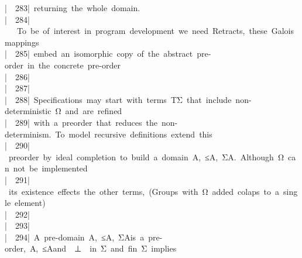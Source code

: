 \documentclass{article}
\newcommand{\syntaxCOMMENTA}[1]{\textcolor[rgb]{0.8,0.0,0.0}{#1}}
\newcommand{\syntaxCOMMENTA}[1]{\textcolor[rgb]{0.8,0.0,0.0}{#1}}
\newcommand{\syntaxCOMMENTA}[1]{\textcolor[rgb]{0.8,0.0,0.0}{#1}}
\newcommand{\syntaxCOMMENTA}[1]{\textcolor[rgb]{0.8,0.0,0.0}{\textbf{#1}}}
\newcommand{\syntaxCOMMENTA}[1]{\textcolor[rgb]{0.8,0.0,0.0}{#1}}
\newcommand{\syntaxCOMMENTA}[1]{\textcolor[rgb]{0.8,0.0,0.0}{#1}}
\newcommand{\syntaxCOMMENTA}[1]{\textcolor[rgb]{0.0,0.0,0.0}{#1}}
\newcommand{\gutter}[1]{\textcolor[rgb]{0,0,0}{{|}#1}}
\newcommand{\gutterH}[1]{\textcolor[rgb]{1,0,0}{{|}#1}}
\begin{document}
\gutter{\ \ 283{|}\ }\syntaxCOMMENTA{returning{\ }the{\ }whole{\ }domain.}\hspace*{\fill}\\
\gutter{\ \ 284{|}\ }\syntaxCOMMENTA{{\ }{\ }To{\ }be{\ }of{\ }interest{\ }in{\ }program{\ }development{\ }we{\ }need{\ }Retracts,{\ }these{\ }Galois{\ }mappings{\ }}\hspace*{\fill}\\
\gutterH{\ \ 285{|}\ }\syntaxCOMMENTA{embed{\ }an{\ }isomorphic{\ }copy{\ }of{\ }the{\ }abstract{\ }pre{-}order{\ }in{\ }the{\ }concrete{\ }pre{-}order}\hspace*{\fill}\\
\gutter{\ \ 286{|}\ }\hspace*{\fill}\\
\gutter{\ \ 287{|}\ }\hspace*{\fill}\\
\gutter{\ \ 288{|}\ }\syntaxCOMMENTA{Specifications{\ }may{\ }start{\ }with{\ }terms{\ }T\usebox{\underscorebox}Σ{\ }that{\ }include{\ }non{-}deterministic{\ }Ω{\ }and{\ }are{\ }refined{\ }}\hspace*{\fill}\\
\gutter{\ \ 289{|}\ }\syntaxCOMMENTA{with{\ }a{\ }preorder{\ }that{\ }reduces{\ }the{\ }non{-}determinism.{\ }To{\ }model{\ }recursive{\ }definitions{\ }extend{\ }this{\ }}\hspace*{\fill}\\
\gutterH{\ \ 290{|}\ }\syntaxCOMMENTA{preorder{\ }by{\ }ideal{\ }completion{\ }to{\ }build{\ }a{\ }domain{\ }\usebox{\lessthan}A,{\ }≤\usebox{\underscorebox}A,{\ }Σ\usebox{\underscorebox}A\usebox{\greaterthan}.{\ }Although{\ }Ω{\ }can{\ }not{\ }be{\ }implemented{\ }}\hspace*{\fill}\\
\gutter{\ \ 291{|}\ }\syntaxCOMMENTA{its{\ }existence{\ }effects{\ }the{\ }other{\ }terms,{\ }(Groups{\ }with{\ }Ω{\ }added{\ }colaps{\ }to{\ }a{\ }single{\ }element)}\hspace*{\fill}\\
\gutter{\ \ 292{|}\ }\hspace*{\fill}\\
\gutter{\ \ 293{|}\ }\hspace*{\fill}\\
\gutter{\ \ 294{|}\ }\syntaxCOMMENTA{A{\ }pre{-}domain{\ }\usebox{\lessthan}A,{\ }≤\usebox{\underscorebox}A,{\ }Σ\usebox{\underscorebox}A\usebox{\greaterthan}{\ }{\ }is{\ }a{\ }pre{-}order,{\ }\usebox{\lessthan}A,{\ }≤\usebox{\underscorebox}A\usebox{\greaterthan}{\ }and{\ }{\ }⊥{\ }{\ }\usebox{\backslashbox}in{\ }Σ{\ }and{\ }f\usebox{\backslashbox}in{\ }Σ{\ }implies{\ }}\hspace*{\fill}\\
\end{document}
